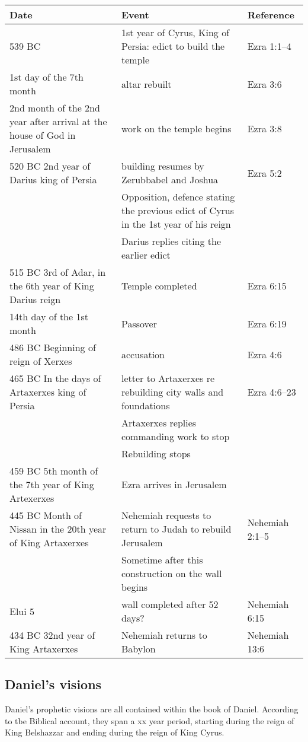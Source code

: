 \documentclass[]{article}
\begin{document}
\begin{center}
\begin{tabular}{lll}
\hline
    Date & Event & Reference \\
\hline\hline
    539 BC & 1st year of Cyrus, King of Persia: edict to build the temple & Ezra 1:1--4 \\
    1st day of the 7th month & altar rebuilt & Ezra 3:6 \\
    2nd month of the 2nd year after arrival at the house of God in Jerusalem & work on the temple begins & Ezra 3:8 \\
    520 BC 2nd year of Darius king of Persia & building resumes by Zerubbabel and Joshua & Ezra 5:2 \\
     & Opposition, defence stating the previous edict of Cyrus in the 1st year of his reign & \\
    & Darius replies citing the earlier edict & \\
    515 BC 3rd of Adar, in the 6th year of King Darius reign & Temple completed & Ezra 6:15 \\
    14th day of the 1st month & Passover & Ezra 6:19 \\
    486 BC Beginning of reign of Xerxes & accusation & Ezra 4:6 \\
    465 BC In the days of Artaxerxes king of Persia & letter to Artaxerxes re rebuilding city walls and foundations & Ezra 4:6--23 \\
     & Artaxerxes replies commanding work to stop & \\
     & Rebuilding stops & \\
    459 BC 5th month of the 7th year of King Artexerxes & Ezra arrives in Jerusalem & \\
    445 BC Month of Nissan in the 20th year of King Artaxerxes & Nehemiah requests to return to Judah to rebuild Jerusalem & Nehemiah 2:1--5 \\
     & Sometime after this construction on the wall begins & \\
    Elui 5 & wall completed after 52 days? & Nehemiah 6:15 \\
    434 BC 32nd year of King Artaxerxes & Nehemiah returns to Babylon & Nehemiah 13:6 \\
\end{tabular}
\end{center}


\subsection{Daniel's visions}
Daniel's prophetic visions are all contained within the book of Daniel.  According to tbe Biblical account, they span a xx year period, starting during the reign of King Belshazzar
and ending during the reign of King Cyrus.
\end{document}
